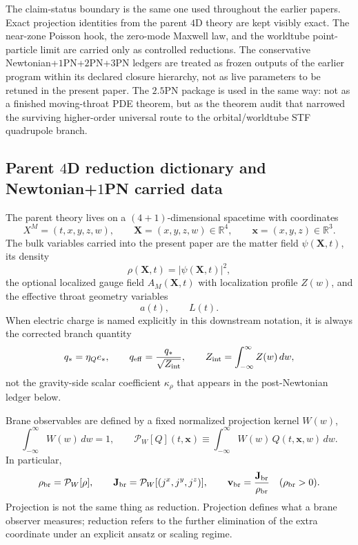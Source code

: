 \documentclass[11pt]{article}
\begin{document}
The claim-status boundary is the same one used throughout the earlier papers.
Exact projection identities from the parent $4$D theory are kept visibly exact.
The near-zone Poisson hook, the zero-mode Maxwell law, and the worldtube
 point-particle limit are carried only as controlled reductions.  The
 conservative Newtonian+$1$PN+$2$PN+$3$PN ledgers are treated as frozen outputs
 of the earlier program within its declared closure hierarchy, not as live
 parameters to be retuned in the present paper.  The $2.5$PN package is used in
 the same way: not as a finished moving-throat PDE theorem, but as the theorem
 audit that narrowed the surviving higher-order universal route to the
 orbital/worldtube STF quadrupole branch.

\subsection{Parent \texorpdfstring{$4$}{4}D reduction dictionary and Newtonian+\texorpdfstring{$1$}{1}PN carried data}
\label{app:carry-forward-1pn}

The parent theory lives on a $(4+1)$-dimensional spacetime with coordinates
\[
X^M=(t,x,y,z,w),
\qquad
\mathbf{X}=(x,y,z,w)\in\mathbb R^4,
\qquad
\mathbf{x}=(x,y,z)\in\mathbb R^3.
\]
The bulk variables carried into the present paper are the matter field
$\psi(\mathbf X,t)$, its density
\[
\rho(\mathbf X,t)=|\psi(\mathbf X,t)|^2,
\]
the optional localized gauge field $A_M(\mathbf X,t)$ with localization profile
$Z(w)$, and the effective throat geometry variables
\[
a(t),\qquad L(t).
\]
When electric charge is named explicitly in this downstream notation, it is
always the corrected branch quantity
\[
q_* = \eta_Q e_*,
\qquad
q_{\rm eff}=\frac{q_*}{\sqrt{Z_{\rm int}}},
\qquad
Z_{\rm int}=\int_{-\infty}^{\infty} Z(w)\,dw,
\]
not the gravity-side scalar coefficient $\kappa_\rho$ that appears in the
post-Newtonian ledger below.

Brane observables are defined by a fixed normalized projection kernel $W(w)$,
\[
\int_{-\infty}^{\infty} W(w)\,dw = 1,
\qquad
\mathcal P_W[Q](t,\mathbf x)
\equiv
\int_{-\infty}^{\infty} W(w)\,Q(t,\mathbf x,w)\,dw.
\]
In particular,
\[
\rho_{\rm br}=\mathcal P_W[\rho],
\qquad
\mathbf J_{\rm br}=\mathcal P_W[(j^x,j^y,j^z)],
\qquad
\mathbf v_{\rm br}=\frac{\mathbf J_{\rm br}}{\rho_{\rm br}}
\quad (\rho_{\rm br}>0).
\]
Projection is not the same thing as reduction.  Projection defines what a brane
 observer measures; reduction refers to the further elimination of the extra
 coordinate under an explicit ansatz or scaling regime.
\end{document}
